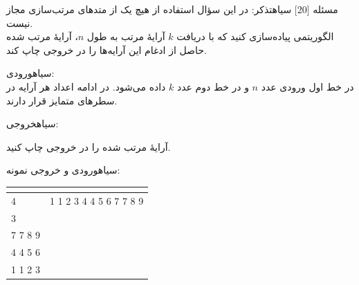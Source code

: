 ‌مسئله [20]
‌سیاه{تذکر: در این سؤال استفاده از هیچ یک از متد‌های مرتب‌سازی مجاز نیست.}\\
الگوریتمی پیاده‌سازی کنید که با دریافت $k$ آرایۀ مرتب به طول $n$، آرایۀ مرتب شده حاصل از ادغام این آرایه‌ها را در خروجی چاپ کند.

‌سیاه{ورودی:}\\
در خط اول  ورودی عدد $n$ و در خط دوم عدد $k$ داده می‌شود. در ادامه اعداد هر آرایه در 
سطرهای متمایز قرار دارند.

‌سیاه{خروجی:}

آرایۀ مرتب شده را در خروجی چاپ کنید.

‌سیاه{ورودی و خروجی نمونه:}

\begin{latin}
	\begin{tabularx}{\textwidth}{|X | X|}
		\hline
		\textbf{\rl{ورودی }} &
		{\centering\textbf{\rl{خروجی }}}\\
		\hline
		4 & 1 1 2 3 4 4 5 6 7 7 8 9\\
		3& \\
		7 7 8 9& \\
		4 4 5 6& \\
		1 1 2 3 & \\
		
		
		
		\hline
		
	\end{tabularx}
\end{latin}









